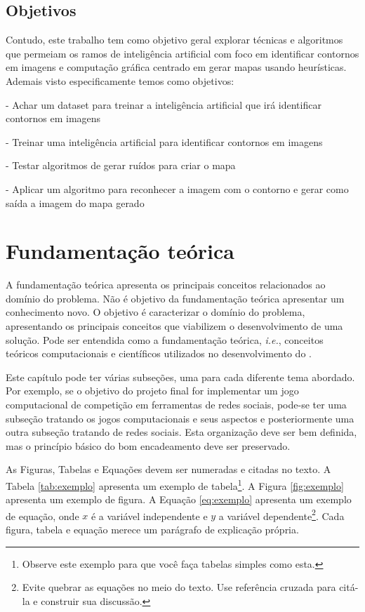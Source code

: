 \documentclass[12pt]{tcc}
\begin{document}
\section{Objetivos}

Contudo, este trabalho tem como objetivo geral explorar técnicas e algoritmos que permeiam os ramos de inteligência artificial com foco em identificar contornos em imagens e computação gráfica centrado em gerar mapas usando heurísticas.
Ademais visto especificamente temos como objetivos:

- Achar um dataset para treinar a inteligência artificial que irá identificar contornos em imagens

- Treinar uma inteligência artificial para identificar contornos em imagens

- Testar algoritmos de gerar ruídos para criar o mapa 

- Aplicar um algoritmo para reconhecer a imagem com o contorno e gerar como saída a imagem do mapa gerado


\chapter{Fundamentação teórica}
\label{sec:background}
	\label{sec:fund_teorica}

A fundamentação teórica apresenta os principais conceitos relacionados ao domínio do problema. Não é objetivo da fundamentação teórica apresentar um conhecimento novo. O objetivo é caracterizar o domínio do problema, apresentando os principais conceitos que viabilizem o desenvolvimento de uma solução. Pode ser entendida como a fundamentação teórica, \emph{i.e.}, conceitos teóricos computacionais e científicos utilizados no desenvolvimento do .

Este capítulo pode ter várias subseções, uma para cada diferente tema abordado. Por exemplo, se o objetivo do projeto final for implementar um jogo computacional de competição em ferramentas de redes sociais, pode-se ter uma subseção tratando os jogos computacionais e seus aspectos e posteriormente uma outra subseção tratando de redes sociais. Esta organização deve ser bem definida, mas o princípio básico do bom encadeamento deve ser preservado.


As Figuras, Tabelas e Equações devem ser numeradas e citadas no texto. A Tabela \ref{tab:exemplo} apresenta um exemplo de tabela\footnote{Observe este exemplo para que você faça tabelas simples como esta.}. A Figura \ref{fig:exemplo} apresenta um exemplo de figura. A Equação \ref{eq:exemplo} apresenta um exemplo de equação, onde $x$ é a variável independente e $y$ a variável dependente\footnote{Evite quebrar as equações no meio do texto. Use referência cruzada para citá-la e construir sua discussão.}. Cada figura, tabela e equação merece um parágrafo de explicação própria.
\end{document}
